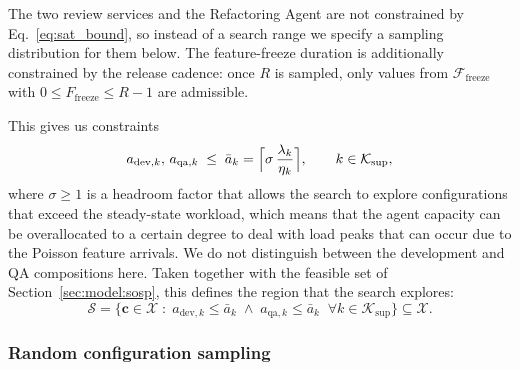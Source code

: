\documentclass[smallextended]{svjour3}       %
\begin{document}
The two review services and the Refactoring Agent are not constrained by Eq.~\eqref{eq:sat_bound}, so instead of a search range we specify a sampling distribution for them below. The feature-freeze duration is additionally constrained by the release cadence: once $R$ is sampled, only values from $\mathcal{F}_\mathrm{freeze}$ with $0 \leq F_\mathrm{freeze} \leq R-1$ are admissible.

This gives us constraints
\begin{equation}
  a_{\mathrm{dev},k},\, a_{\mathrm{qa},k} \;\leq\; \bar{a}_k
    = \Bigl\lceil \sigma\,\frac{\lambda_k}{\eta_k} \Bigr\rceil,
  \qquad k \in \mathcal{K}_\mathrm{sup},
  \label{eq:sat_bound}
\end{equation}
where $\sigma \geq 1$ is a headroom factor that allows the search to explore configurations that exceed the steady-state workload, which means that the agent capacity can be overallocated to a certain degree to deal with load peaks that can occur due to the Poisson feature arrivals. We do not distinguish between the development and QA compositions here. Taken together with the feasible set of Section~\ref{sec:model:sosp}, this defines the region that the search explores:
\begin{equation}
  \mathcal{S} = \bigl\{\mathbf{c} \in \mathcal{X} \;:\;
    a_{\mathrm{dev},k} \leq \bar{a}_k \;\wedge\;
    a_{\mathrm{qa},k} \leq \bar{a}_k
    \;\;\forall k \in \mathcal{K}_\mathrm{sup} \bigr\} \subseteq \mathcal{X}.
  \label{eq:searched_region}
\end{equation}


\subsubsection{Random configuration sampling}
\label{sec:model:search:random}
\end{document}
